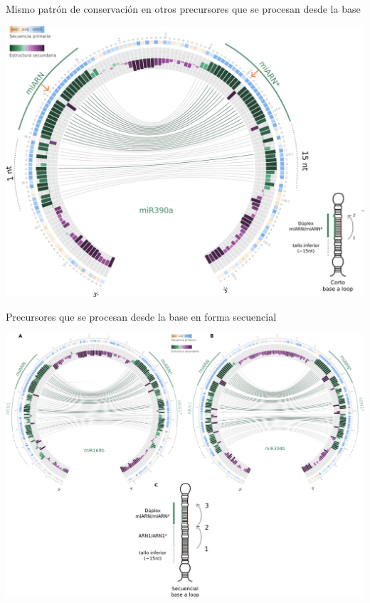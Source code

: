 \documentclass{beamer}
\begin{document}
\begin{frame}{Mismo patrón de conservación en otros precursores que se procesan desde la base}
	\begin{center}
		\includegraphics[width=.8\textwidth]{img/miR390a_circos_defensa.png}
	\end{center}
\end{frame}

\begin{frame}{Precursores que se procesan desde la base en forma secuencial}
	\begin{center}
		\includegraphics[width=1\textwidth]{img/seqBTL_circos_defensa.png}
	\end{center}
\end{frame}
\end{document}
